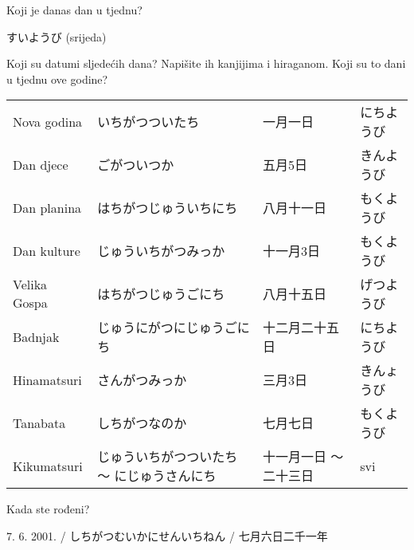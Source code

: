 
\author{Katja Kržišnik}

	
	\vspace{15pt}
	\noindent Koji je danas dan u tjednu?
	
	すいようび (srijeda)
	
	\vspace{15pt}
	\noindent Koji su datumi sljedećih dana? Napišite ih kanjijima i hiraganom. Koji su to dani u tjednu ove godine?
	
	\begin{tabular}{l l l l }
		Nova godina&いちがつついたち&一月一日& にちようび  \\
		Dan djece   &  ごがついつか &  五月5日 & きんようび  \\
		Dan planina  &  はちがつじゅういちにち & 八月十一日 & もくようび  \\
		Dan kulture  &  じゅういちがつみっか & 十一月3日 & もくようび  \\
		Velika Gospa  &  はちがつじゅうごにち　&  八月十五日　& げつようび  \\
		Badnjak  &  じゅうにがつにじゅうごにち & 十二月二十五日 & にちようび \\
		Hinamatsuri  & さんがつみっか&三月3日&きんょうび  \\
		Tanabata  & しちがつなのか & 七月七日 & もくようび \\
		Kikumatsuri  & じゅういちがつついたち ～ にじゅうさんにち & 十一月一日 ～ 二十三日  & svi \\
	\end{tabular}

	\vspace{15pt}
    \noindent Kada ste rođeni?
    
    7. 6. 2001. / しちがつむいかにせんいちねん / 七月六日二千一年
	
